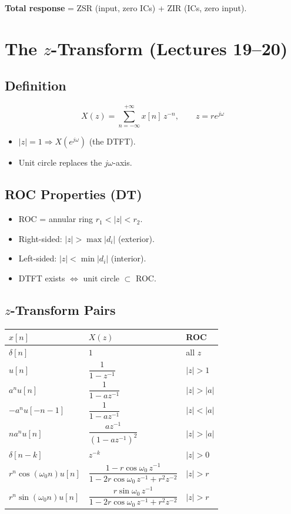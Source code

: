 \documentclass[11pt]{article}
\begin{document}
\textbf{Total response} = ZSR (input, zero ICs) + ZIR (ICs, zero input).

\section{The $z$-Transform (Lectures 19--20)}

\subsection{Definition}
\[ X(z) = \sum_{n=-\infty}^{+\infty} x[n]\,z^{-n}, \qquad z = re^{j\omega} \]

\begin{itemize}
  \item $|z| = 1 \Rightarrow X(e^{j\omega})$ (the DTFT).
  \item Unit circle replaces the $j\omega$-axis.
\end{itemize}

\subsection{ROC Properties (DT)}
\begin{itemize}
  \item ROC = annular ring $r_1 < |z| < r_2$.
  \item Right-sided: $|z| > \max |d_i|$ (exterior).
  \item Left-sided: $|z| < \min |d_i|$ (interior).
  \item DTFT exists $\iff$ unit circle $\subset$ ROC.
\end{itemize}

\subsection{$z$-Transform Pairs}
\begin{center}
\begin{tabular}{lll}
\toprule
$x[n]$ & $X(z)$ & ROC \\
\midrule
$\delta[n]$ & $1$ & all $z$ \\
$u[n]$ & $\dfrac{1}{1 - z^{-1}}$ & $|z| > 1$ \\
$a^n u[n]$ & $\dfrac{1}{1 - a z^{-1}}$ & $|z| > |a|$ \\
$-a^n u[-n-1]$ & $\dfrac{1}{1 - a z^{-1}}$ & $|z| < |a|$ \\
$n a^n u[n]$ & $\dfrac{a z^{-1}}{(1 - a z^{-1})^2}$ & $|z| > |a|$ \\
$\delta[n - k]$ & $z^{-k}$ & $|z| > 0$ \\
$r^n \cos(\omega_0 n)u[n]$ & $\dfrac{1 - r\cos\omega_0\,z^{-1}}{1 - 2r\cos\omega_0\,z^{-1} + r^2 z^{-2}}$ & $|z| > r$ \\
$r^n \sin(\omega_0 n)u[n]$ & $\dfrac{r\sin\omega_0\,z^{-1}}{1 - 2r\cos\omega_0\,z^{-1} + r^2 z^{-2}}$ & $|z| > r$ \\
\bottomrule
\end{tabular}
\end{center}
\end{document}
